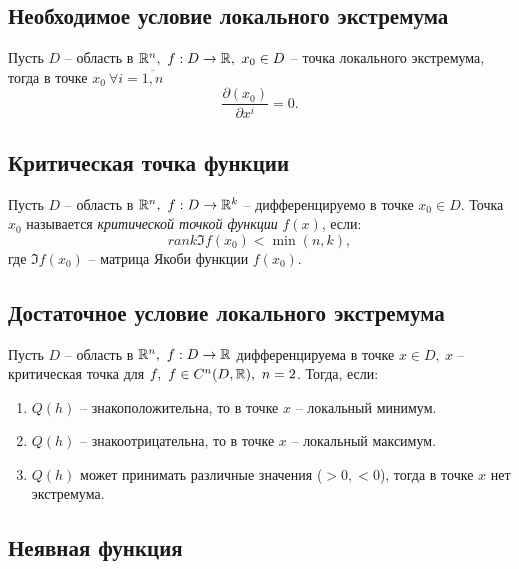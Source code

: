 \subsection{Необходимое условие локального экстремума}

\begin{theorem}
    Пусть $D$ -- область в $ \mathbb{R}^n, \ f:D \rightarrow\mathbb{R}, \ x_0 \in D $ -- точка локального экстремума, тогда в точке $ x_0 \ \forall i = \overline{1,n}$
    \[
        \frac{\partial(x_0)}{\partial x^i} = 0.
    \]
\end{theorem}

\subsection{Критическая точка функции}

\begin{definition}
    Пусть $ D $ -- область в $ \mathbb{R}^n, \ f:D \rightarrow\mathbb{R}^k $ -- дифференцируемо в точке $ x_0 \in D $. Точка $ x_0 $ называется \emph{критической точкой функции} $ f(x) $, если:
    \[
        rank \mathfrak{I} f(x_0) < \min(n,k),
    \] где $ \mathfrak{I}f(x_0) $ -- матрица Якоби функции $ f(x_0) $.
\end{definition}

\subsection{Достаточное условие локального экстремума}

\begin{theorem}
    Пусть $D$ -- область в $\mathbb{R}^n, \ f: D \rightarrow \mathbb{R}$ дифференцируема в точке $x \in D, \ x$ -- критическая точка для $f, \ f \in C^n(D,\mathbb{R}), \ n = 2$. Тогда, если:
    \begin{enumerate}
        \item $Q(h)$ -- знакоположительна, то в точке $x$ -- локальный минимум.
        \item $Q(h)$ -- знакоотрицательна, то в точке $x$ -- локальный максимум.
        \item $Q(h)$ может принимать различные значения ($>0, < 0$), тогда в точке $x$ нет экстремума.
    \end{enumerate}
\end{theorem}

\subsection{Неявная функция}

